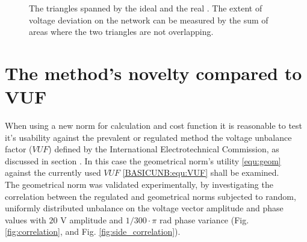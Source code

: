 \begin{figure}[!ht]
           \caption{The triangles spanned by the ideal and the real . The extent of voltage deviation on the network can be measured by the sum of areas where the two triangles are not overlapping.}
           \label{fig:threephase}
            \end{figure}

\section{The method's novelty compared to VUF}\label{VUB:sec:AdditionalContent}

When using a new norm for calculation and cost function it is reasonable to test it's usability against the prevalent or regulated method the voltage unbalance factor ($VUF$) defined by the International Electrotechnical Commission, as discussed in section . In this case the geometrical norm's utility \ref{equ:geom} against the currently used $VUF$ \ref{BASICUNB:equ:VUF} shall be examined. \\
The geometrical norm was validated experimentally, by investigating the correlation between the regulated  and geometrical norms subjected to random, uniformly distributed unbalance on the voltage vector amplitude and phase values with $20$ V amplitude and $1/300\cdot\pi$ rad phase variance (Fig. \ref{fig:correlation}, and Fig. \ref{fig:side_correlation}).

